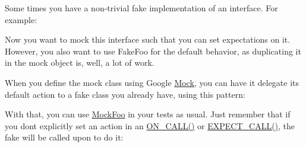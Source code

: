Some times you have a non-\/trivial fake implementation of an interface. For example\+:


\begin{DoxyCode}{0}
\DoxyCodeLine{\};}
\DoxyCodeLine{}
\DoxyCodeLine{  \}}
\DoxyCodeLine{}
\DoxyCodeLine{  \}}
\DoxyCodeLine{\};}
\end{DoxyCode}


Now you want to mock this interface such that you can set expectations on it. However, you also want to use {\ttfamily Fake\+Foo} for the default behavior, as duplicating it in the mock object is, well, a lot of work.

When you define the mock class using Google \mbox{\hyperlink{class_mock}{Mock}}, you can have it delegate its default action to a fake class you already have, using this pattern\+:


\begin{DoxyCode}{0}
\DoxyCodeLine{}
\DoxyCodeLine{}
\DoxyCodeLine{  \}}
\DoxyCodeLine{\};}
\end{DoxyCode}


With that, you can use {\ttfamily \mbox{\hyperlink{class_mock_foo}{Mock\+Foo}}} in your tests as usual. Just remember that if you don\textquotesingle{}t explicitly set an action in an {\ttfamily \mbox{\hyperlink{googletest-master_2googlemock_2include_2gmock_2gmock-spec-builders_8h_a5b12ae6cf84f0a544ca811b380c37334}{O\+N\+\_\+\+C\+A\+L\+L()}}} or {\ttfamily \mbox{\hyperlink{googletest-master_2googlemock_2include_2gmock_2gmock-spec-builders_8h_a535a6156de72c1a2e25a127e38ee5232}{E\+X\+P\+E\+C\+T\+\_\+\+C\+A\+L\+L()}}}, the fake will be called upon to do it\+:


